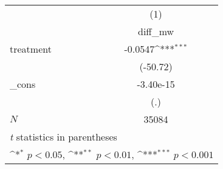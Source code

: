 {
\def\sym#1{\ifmmode^{#1}\else\(^{#1}\)\fi}
\begin{tabular}{l*{1}{c}}
\hline\hline
            &\multicolumn{1}{c}{(1)}\\
            &\multicolumn{1}{c}{diff\_mw}\\
\hline
treatment   &     -0.0547\sym{***}\\
            &    (-50.72)         \\
[1em]
\_cons      &   -3.40e-15         \\
            &         (.)         \\
\hline
\(N\)       &       35084         \\
\hline\hline
\multicolumn{2}{l}{\footnotesize \textit{t} statistics in parentheses}\\
\multicolumn{2}{l}{\footnotesize \sym{*} \(p<0.05\), \sym{**} \(p<0.01\), \sym{***} \(p<0.001\)}\\
\end{tabular}
}
